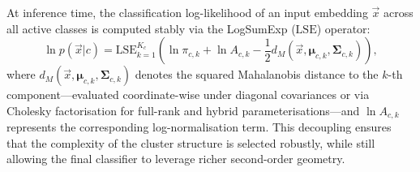 At inference time, the classification log-likelihood of an input embedding $\vec{x}$ across all active classes is computed stably via the LogSumExp ($\text{LSE}$) operator:
\begin{equation}
	\ln p(\vec{x}|c) = \text{LSE}_{k=1}^{K_c} \left( \ln \pi_{c,k} + \ln A_{c,k} - \frac{1}{2} d_M(\vec{x}, \boldsymbol{\mu}_{c,k}, \boldsymbol{\Sigma}_{c,k}) \right),
\end{equation}
where $d_M(\vec{x}, \boldsymbol{\mu}_{c,k}, \boldsymbol{\Sigma}_{c,k})$ denotes the squared Mahalanobis distance to the $k$-th component—evaluated coordinate-wise under diagonal covariances or via Cholesky factorisation for full-rank and hybrid parameterisations—and $\ln A_{c,k}$ represents the corresponding log-normalisation term. This decoupling ensures that the complexity of the cluster structure is selected robustly, while still allowing the final classifier to leverage richer second-order geometry.


